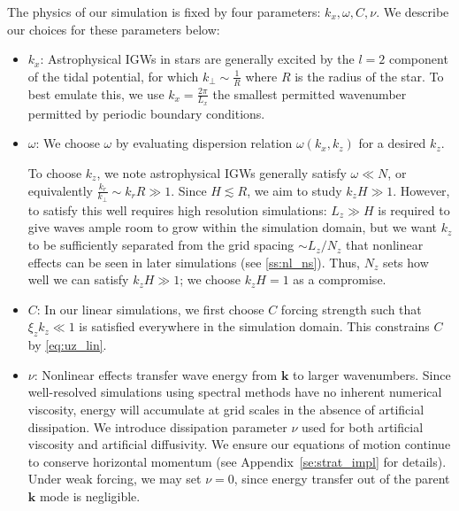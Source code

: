 \documentclass[
        fleqn,
        usenatbib,
    ]{mnras}
\newcommand*{\p}[1]{\left(#1\right)}
\newcommand*{\bm}[1]{\boldsymbol{\mathbf{#1}}}
\begin{document}
The physics of our simulation is fixed by four parameters: $k_{x}, \omega, C,
\nu$. We describe our choices for these parameters below:
\begin{itemize}
    \item $k_{x}$: Astrophysical IGWs in stars are generally excited by the $l
        = 2$ component of the tidal potential, for which $k_{\perp} \sim
        \frac{1}{R}$ where $R$ is the radius of the star. To best emulate this,
        we use $k_{x} = \frac{2\pi}{L_x}$ the smallest permitted wavenumber
        permitted by periodic boundary conditions.

    \item $\omega$: We choose $\omega$ by evaluating dispersion relation
        $\omega\p{k_{x}, k_{z}}$ for a desired $k_{z}$.

        To choose $k_z$, we note astrophysical IGWs generally satisfy $\omega
        \ll N$, or equivalently $\frac{k_r}{k_{\perp}} \sim k_rR \gg 1$. Since
        $H \lesssim R$, we aim to study $k_{z}H \gg 1$. However, to satisfy this
        well requires high resolution simulations: $L_z \gg H$ is required to
        give waves ample room to grow within the simulation domain, but we want
        $k_{z}$ to be sufficiently separated from the grid spacing $\sim L_z /
        N_z$ that nonlinear effects can be seen in later simulations (see
        \autoref{ss:nl_ns}). Thus, $N_z$ sets how well we can satisfy $k_{z}H
        \gg 1$; we choose $k_{z}H = 1$ as a compromise.

    \item $C$: In our linear simulations, we first choose $C$ forcing strength
        such that $\xi_z k_z \ll 1$ is satisfied everywhere in the simulation
        domain. This constrains $C$ by \autoref{eq:uz_lin}.

    \item $\nu$: Nonlinear effects transfer wave energy from $\bm{k}$ to
        larger wavenumbers. Since well-resolved simulations using spectral
        methods have no inherent numerical viscosity, energy will accumulate at
        grid scales in the absence of artificial dissipation. We introduce
        dissipation parameter $\nu$ used for both artificial viscosity and
        artificial diffusivity. We ensure our equations of motion continue to
        conserve horizontal momentum (see Appendix~\ref{se:strat_impl} for
        details). Under weak forcing, we may set $\nu = 0$, since energy
        transfer out of the parent $\bm{k}$ mode is negligible.
\end{itemize}
\end{document}
